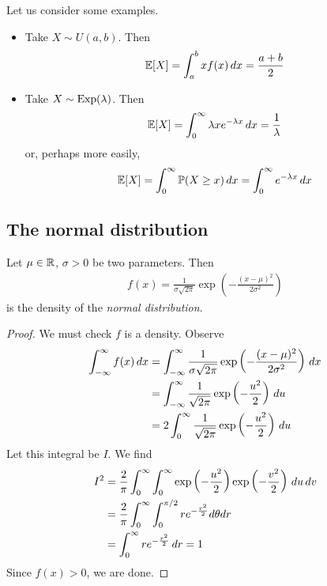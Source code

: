 \documentclass{../template/note}
\begin{document}
    \begin{example*}
        Let us consider some examples.
        \begin{itemize}
            \item Take \(X \sim U(a, b)\). Then
            \begin{align*}
                \mathbb E[X] = \int_a^b xf(x) \,d{x} = \frac{a+b} 2
            \end{align*}
            \item Take \(X \sim \operatorname{Exp}(\lambda)\). Then
            \begin{align*}
                \mathbb E[X] = \int_0^\infty \lambda x e^{-\lambda x} \,d{x} = \frac 1 \lambda
            \end{align*}
            or, perhaps more easily,
            \begin{align*}
                \mathbb E[X] = \int_0^\infty \mathbb P(X \geq x) \,d{x} = \int_0^\infty e^{-\lambda x} \,d{x}
            \end{align*}
        \end{itemize}
    \end{example*}
    
    \subsection{The normal distribution}

    \begin{definition}
        Let \(\mu \in \mathbb R\), \(\sigma > 0\) be two parameters. Then
        \begin{align*}
            f(x) = \frac 1 {\sigma \sqrt{2\pi}} \exp\left(-\frac{(x-\mu)^2}{2\sigma^2}\right)
        \end{align*}
        is the density of the \emph{normal distribution}.       
    \end{definition}
    
    \begin{proof}
        We must check \(f\) is a density. Observe
        \begin{align*}
            \int_{-\infty}^\infty f(x) \,d{x} &= \int_{-\infty}^\infty \frac 1 {\sigma \sqrt{2\pi}} \exp\left(-\frac{(x-\mu)^2}{2\sigma^2}\right) \,d{x} \\
            &= \int_{-\infty}^\infty \frac 1 {\sqrt{2\pi}} \exp\left(-\frac {u^2}2\right) \,d{u} \\
            &= 2 \int_0^\infty \frac 1 {\sqrt{2\pi}} \exp\left(-\frac {u^2}2\right) \,d{u}
        \end{align*}
        Let this integral be \(I\). We find
        \begin{align*}
            I^2 &= \frac 2 \pi \int_0^\infty \int_0^\infty \exp\left(-\frac{u^2}2\right)\exp\left(-\frac{v^2}2\right) \,d{u} \,d{v} \\
            &= \frac 2 \pi \int_0^\infty \int_0^{\pi/2} re^{-\frac{r^2}2} d\theta dr \\
            &= \int_0^\infty r e^{-\frac{r^2}2} \,d{r} = 1
        \end{align*}
        Since \(f(x) > 0\), we are done.
    \end{proof}
    
\end{document}
